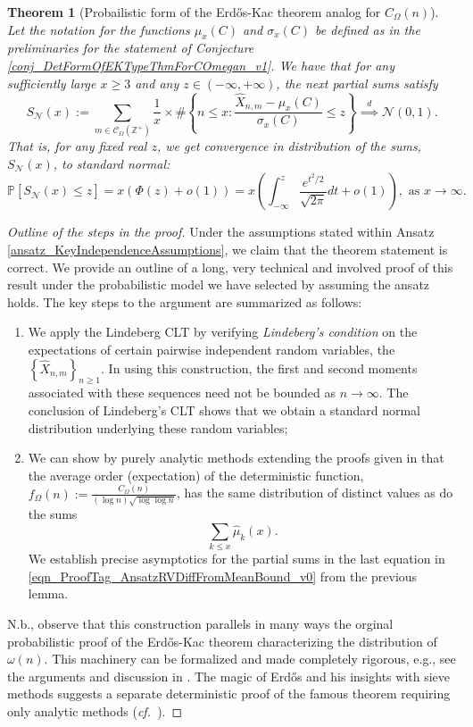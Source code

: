 \documentclass[11pt,reqno,a4letter]{article}
\numberwithin{figure}{section}
\numberwithin{table}{section}
\newcommand{\cf}{\textit{cf.\ }}
\theoremstyle{plain}
\newtheorem{theorem}{Theorem}
\numberwithin{theorem}{section}
\theoremstyle{definition}
\begin{document}
\begin{theorem}[Probailistic form of the Erd\H{o}s-Kac theorem analog for $C_{\Omega}(n)$]
\label{theorem_CLT_VI} 
Let the notation for the functions $\mu_x(C)$ and $\sigma_x(C)$ be 
defined as in the preliminaries for the 
statement of Conjecture \ref{conj_DetFormOfEKTypeThmForCOmegan_v1}. 
We have that for any sufficiently large $x \geq 3$ and any $z \in (-\infty, +\infty)$, 
the next partial sums satisfy  
\[
S_{\mathcal{N}}(x) := \sum_{m \in \mathcal{C}_{\Omega}(\mathbb{Z}^{+})} \frac{1}{x} \times 
     \#\left\{ n \leq x: \frac{\widehat{X}_{n,m} - \mu_x(C)}{\sigma_x(C)} \leq z\right\} 
     \overset{d}{\implies} \mathcal{N}(0, 1). 
\]
That is, for any fixed real $z$, we get convergence in distribution of the sums, $S_{\mathcal{N}}(x)$, to standard normal: 
\[
\mathbb{P}\left[S_{\mathcal{N}}(x) \leq z\right] = x\left(\Phi(z) + o(1)\right) = 
     x \left(\int_{-\infty}^{z} \frac{e^{t^2/2}}{\sqrt{2\pi}} dt + o(1)\right), 
     \text{ as } x \rightarrow \infty. 
\]
\end{theorem}
\begin{proof}[Outline of the steps in the proof]
Under the assumptions stated within 
Ansatz \ref{ansatz_KeyIndependenceAssumptions}, we claim that the theorem statement is correct. 
We provide an outline of a long, very technical and involved proof of this result under the 
probabilistic model we have selected by assuming the ansatz holds. The key steps to the argument 
are summarized as follows: 
\begin{enumerate}
\item We apply the Lindeberg CLT by verifying \emph{Lindeberg's condition} on the expectations of 
      certain pairwise independent random variables, the $\left\{\widehat{X}_{n,m}\right\}_{n \geq 1}$. 
      In using this construction, the first and second moments associated with these sequences need not be 
      bounded as $n \rightarrow \infty$. The conclusion of Lindeberg's CLT shows that 
      we obtain a standard normal distribution underlying these random variables; 
\item We can show by purely analytic methods extending the proofs given in \cite[\S 7.4]{MV} that the 
      average order (expectation) of the deterministic function, 
      $f_{\Omega}(n) := \frac{C_{\Omega}(n)}{(\log n)\sqrt{\log\log n}}$, 
      has the same distribution of distinct values as do the sums 
      \[
      \sum_{k \leq x} \widehat{\mu}_k(x). 
      \]
      We establish precise asymptotics for the partial sums in the last equation in 
      \eqref{eqn_ProofTag_AnsatzRVDiffFromMeanBound_v0} from the previous lemma. 
\end{enumerate} 
N.b., observe that this construction parallels in many ways the orginal probabilistic proof of the 
Erd\H{o}s-Kac theorem characterizing the distribution of $\omega(n)$. This machinery can be formalized and 
made completely rigorous, e.g., see the arguments and discussion in 
\cite{BILLINGSLY-CLT-PRIMEDIVFUNC}. 
The magic of Erd\H{o}s and his insights with sieve methods suggests a separate 
deterministic proof of the famous theorem requiring only analytic methods 
(\cf \cite{ERDOS-KAC-REF}). 
\end{proof}
\end{document}
